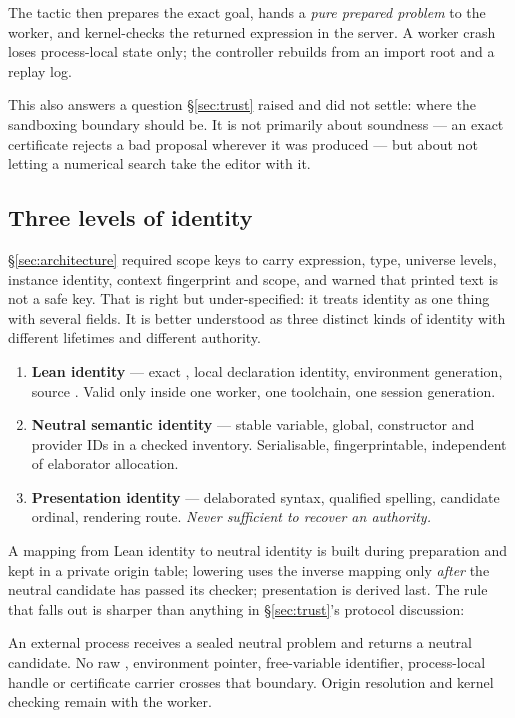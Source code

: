 The tactic then prepares the exact goal, hands a \emph{pure prepared problem}
to the worker, and kernel-checks the returned expression in the server. A worker
crash loses process-local state only; the controller rebuilds from an import
root and a replay log.

This also answers a question \S\ref{sec:trust} raised and did not settle: where
the sandboxing boundary should be. It is not primarily about soundness --- an
exact certificate rejects a bad proposal wherever it was produced --- but about
not letting a numerical search take the editor with it.

\subsection{Three levels of identity}
\label{sec:identity}

\S\ref{sec:architecture} required scope keys to carry expression, type,
universe levels, instance identity, context fingerprint and scope, and warned
that printed text is not a safe key. That is right but under-specified: it
treats identity as one thing with several fields. It is better understood as
three distinct kinds of identity with different lifetimes and different
authority.

\begin{enumerate}[leftmargin=1.4em]
\item \textbf{Lean identity} --- exact , local declaration identity,
  environment generation, source . Valid only inside one worker, one
  toolchain, one session generation.
\item \textbf{Neutral semantic identity} --- stable variable, global,
  constructor and provider IDs in a checked inventory. Serialisable,
  fingerprintable, independent of elaborator allocation.
\item \textbf{Presentation identity} --- delaborated syntax, qualified
  spelling, candidate ordinal, rendering route. \emph{Never sufficient to
  recover an authority.}
\end{enumerate}

A mapping from Lean identity to neutral identity is built during preparation
and kept in a private origin table; lowering uses the inverse mapping only
\emph{after} the neutral candidate has passed its checker; presentation is
derived last. The rule that falls out is sharper than anything in
\S\ref{sec:trust}'s protocol discussion:

\begin{invariant}
\label{inv:origin}
An external process receives a sealed neutral problem and returns a neutral
candidate. No raw , environment pointer, free-variable identifier,
process-local handle or certificate carrier crosses that boundary. Origin
resolution and kernel checking remain with the worker.
\end{invariant}

